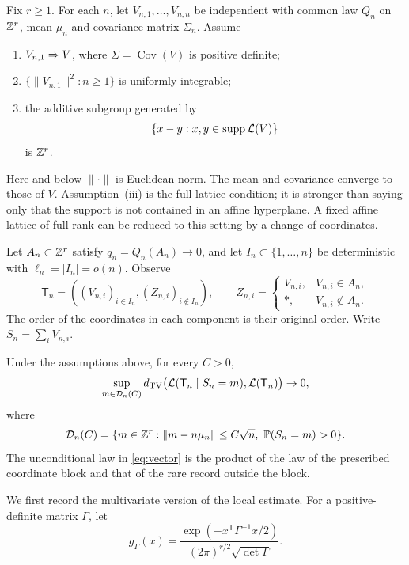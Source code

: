 Fix $r\ge1$. For each $n$, let $V_{n,1},\ldots,V_{n,n}$ be independent with common law $Q_n$ on $\mathbb Z^r$, mean $\mu_n$ and covariance matrix $\Sigma_n$. Assume
\begin{enumerate}
 \item $V_{n,1}\mathrel{\Rightarrow} V$, where $\Sigma=\operatorname{Cov}(V)$ is positive definite;
 \item $\{\|V_{n,1}\|^2:n\ge1\}$ is uniformly integrable;
 \item the additive subgroup generated by
 \begin{equation}\label{eq:fullspan}
 \{x-y:x,y\in\operatorname{supp}\mathcal L(V)\}
 \end{equation}
 is $\mathbb Z^r$.
\end{enumerate}
Here and below $\|\cdot\|$ is Euclidean norm. The mean and covariance converge to those of $V$. Assumption~(iii) is the full-lattice condition; it is stronger than saying only that the support is not contained in an affine hyperplane. A fixed affine lattice of full rank can be reduced to this setting by a change of coordinates.

Let $A_n\subset\mathbb Z^r$ satisfy $q_n=Q_n(A_n)\to0$, and let $I_n\subset\{1,\ldots,n\}$ be deterministic with $\ell_n=|I_n|=o(n)$. Observe
\begin{equation}\label{eq:blockrecord}
 \mathsf T_n=\left((V_{n,i})_{i\in I_n},
       (Z_{n,i})_{i\notin I_n}\right),\qquad
 Z_{n,i}=\begin{cases}V_{n,i},&V_{n,i}\in A_n,\\ *,&V_{n,i}\notin A_n.
 \end{cases}
\end{equation}
The order of the coordinates in each component is their original order. Write $S_n=\sum_iV_{n,i}$.

\begin{theorem}\label{thm:vector}
Under the assumptions above, for every $C>0$,
\begin{equation}\label{eq:vector}
 \sup_{m\in\mathcal D_n(C)}
 d_{\mathrm{TV}}\bigl(\mathcal L(\mathsf T_n\mid S_n=m),\mathcal L(\mathsf T_n)\bigr)\to0,
\end{equation}
where
\[
 \mathcal D_n(C)=\{m\in\mathbb Z^r:\|m-n\mu_n\|\le C\sqrt n,
                      \ \mathbb P(S_n=m)>0\}.
\]
The unconditional law in \eqref{eq:vector} is the product of the law of the prescribed coordinate block and that of the rare record outside the block.
\end{theorem}

We first record the multivariate version of the local estimate. For a positive-definite matrix $\Gamma$, let
\[
 g_\Gamma(x)=\frac{\exp(-x^{\mathsf T}\Gamma^{-1}x/2)}
 {(2\pi)^{r/2}\sqrt{\det\Gamma}}.
\]

